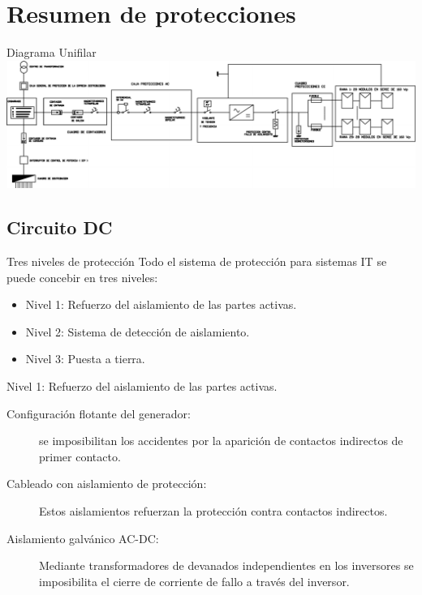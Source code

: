 \documentclass[xcolor={usenames,svgnames,dvipsnames}]{beamer}
\begin{document}
\section{Resumen de protecciones}
\label{sec-5}

\begin{frame}[plain,label=sec-5-0-1]{Diagrama Unifilar}
\includegraphics[width=1.2\textwidth]{../figs/UnifilarCR1.pdf}
\end{frame}

\subsection{Circuito DC}
\label{sec-5-1}


\begin{frame}[label=sec-5-1-1]{Tres niveles de protección}
Todo el sistema de protección para sistemas IT se puede concebir en tres
niveles:

\begin{itemize}
\item Nivel 1: Refuerzo del aislamiento de las partes activas.

\item Nivel 2: Sistema de detección de aislamiento.

\item Nivel 3: Puesta a tierra.
\end{itemize}
\end{frame}

\begin{frame}[label=sec-5-1-2]{Nivel 1: Refuerzo del aislamiento de las partes activas.}
\begin{description}
\item[{Configuración flotante del generador:}] se imposibilitan los
accidentes por la aparición de contactos indirectos de primer
contacto.

\item[{Cableado con aislamiento de protección:}] Estos aislamientos
refuerzan la protección contra contactos indirectos.

\item[{Aislamiento galvánico AC-DC:}] Mediante transformadores de devanados
independientes en los inversores se imposibilita el cierre de
corriente de fallo a través del inversor.
\end{description}
\end{frame}
\end{document}
